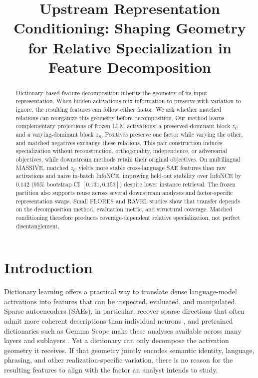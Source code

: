 \documentclass[11pt]{article}
\title{Upstream Representation Conditioning: Shaping Geometry for Relative Specialization in Feature Decomposition}
\author{}
\begin{document}
\raggedbottom
\maketitle

\begin{abstract}
Dictionary-based feature decomposition inherits the geometry of its input representation. When hidden activations mix information to preserve with variation to ignore, the resulting features can follow either factor. We ask whether matched relations can reorganize this geometry before decomposition. Our method learns complementary projections of frozen LLM activations: a preserved-dominant block $z_C$ and a varying-dominant block $z_S$. Positives preserve one factor while varying the other, and matched negatives exchange these relations. This pair construction induces specialization without reconstruction, orthogonality, independence, or adversarial objectives, while downstream methods retain their original objectives. On multilingual MASSIVE, matched $z_C$ yields more stable cross-language SAE features than raw activations and naive in-batch InfoNCE, improving held-out stability over InfoNCE by $0.142$ (95\% bootstrap CI $[0.131,0.153]$) despite lower instance retrieval. The frozen partition also supports reuse across several downstream analyses and factor-specific representation swaps. Small FLORES and RAVEL studies show that transfer depends on the decomposition method, evaluation metric, and structural coverage. Matched conditioning therefore produces coverage-dependent relative specialization, not perfect disentanglement.
\end{abstract}

\section{Introduction}
Dictionary learning offers a practical way to translate dense language-model activations into features that can be inspected, evaluated, and manipulated. Sparse autoencoders (SAEs), in particular, recover sparse directions that often admit more coherent descriptions than individual neurons \citep{cunningham2023sparse,gao2024scaling}, and pretrained dictionaries such as Gemma Scope make these analyses available across many layers and sublayers \citep{lieberum2024gemmascope}. Yet a dictionary can only decompose the activation geometry it receives. If that geometry jointly encodes semantic identity, language, phrasing, and other realization-specific variation, there is no reason for the resulting features to align with the factor an analyst intends to study.
\end{document}
